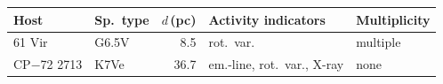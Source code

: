 \begin{tabular}{@{}llr p{1.75cm} l@{}}
\hline
Host & Sp.\ type & $d$\,(pc) & Activity indicators & Multiplicity \\
\hline
61 Vir & G6.5V & 8.5 & rot.\ var. & multiple \\
CP$-$72 2713 & K7Ve & 36.7 & em.-line, rot.\ var., X-ray & none \\
\hline
\end{tabular}

